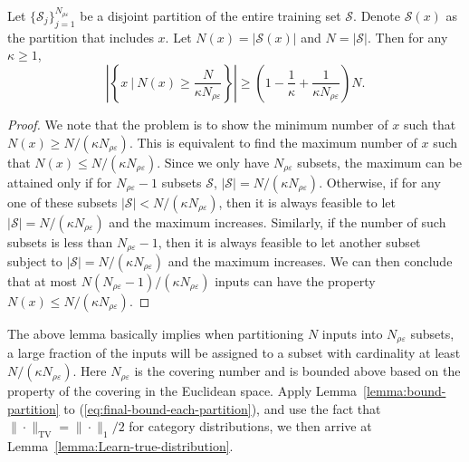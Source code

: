 \begin{lemma}
\label{lemma:bound-partition}
Let $\{\mathcal{S}_j\}_{j=1}^{N_{\rho\varepsilon}}$ be a disjoint partition of the entire training set $\mathcal{S}$. Denote $\mathcal{S}(x)$ as the partition that includes $x$. Let $N(x) = |\mathcal{S}(x)|$ and $N = |\mathcal{S}|$.
 Then for any $\kappa \ge 1$,
 \begin{equation}
     \left| \left\{ x ~|~ N(x) \ge \frac{ N }{\kappa N_{\rho\varepsilon}}  \right\} \right| \ge \left(1 - \frac{1}{\kappa} + \frac{1}{\kappa N_{\rho\varepsilon}}\right)N.
 \end{equation}
\end{lemma}
\begin{proof}
We note that the problem is to show the minimum number of $x$ such that $N(x) \ge N / (\kappa N_{\rho\varepsilon})$. This is equivalent to find the maximum number of $x$ such that $N(x) \le N / (\kappa N_{\rho\varepsilon})$. Since we only have $N_{\rho\varepsilon}$ subsets, the maximum can be attained only if for $N_{\rho\varepsilon} - 1$ subsets $\mathcal{S}$, $|\mathcal{S}| = N / (\kappa N_{\rho\varepsilon})$. Otherwise, if for any one of these subsets $|\mathcal{S}| < N / (\kappa N_{\rho\varepsilon})$, then it is always feasible to let $|\mathcal{S}| = N / (\kappa N_{\rho\varepsilon})$ and the maximum increases. Similarly, if the number of such subsets is less than $N_{\rho\varepsilon} - 1$, then it is always feasible to let another subset subject to $|\mathcal{S}| = N / (\kappa N_{\rho\varepsilon})$ and the maximum increases. We can then conclude that at most $N(N_{\rho\varepsilon} - 1)/(\kappa N_{\rho\varepsilon})$ inputs can have the property $N(x) \le N / (\kappa N_{\rho\varepsilon})$.

\end{proof}
The above lemma basically implies when partitioning $N$ inputs into $N_{\rho\varepsilon}$ subsets, a large fraction of the inputs will be assigned to a subset with cardinality at least $N / (\kappa N_{\rho\varepsilon})$. Here $N_{\rho\varepsilon}$ is the covering number and is bounded above based on the property of the covering in the Euclidean space. Apply Lemma~\ref{lemma:bound-partition} to (\ref{eq:final-bound-each-partition}), and use the fact that $\|\cdot\|_{\text{TV}} = \|\cdot\|_1/2$ for category distributions, we then arrive at Lemma~\ref{lemma:Learn-true-distribution}.






